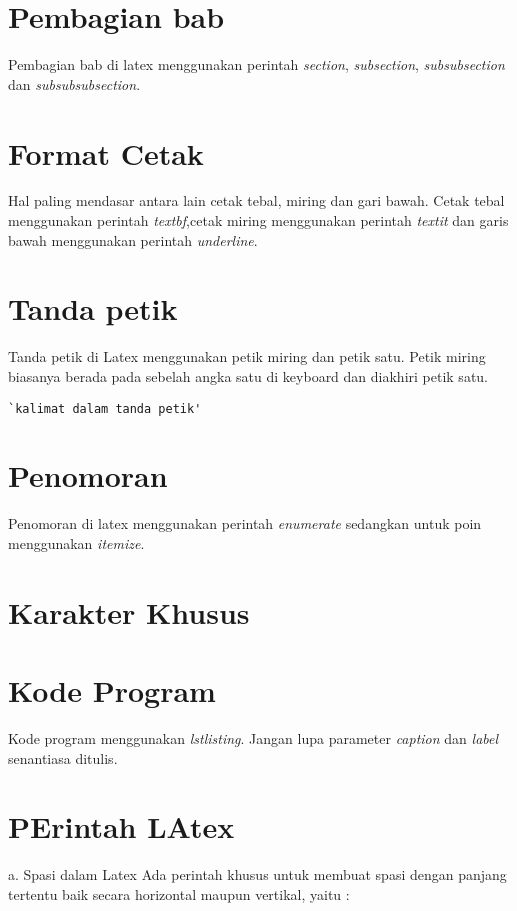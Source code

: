 \section{Pembagian bab}
Pembagian bab di latex menggunakan perintah \textit{section}, \textit{subsection}, \textit{subsubsection} dan \textit{subsubsubsection}.


\section{Format Cetak}
Hal paling mendasar antara lain cetak tebal, miring dan gari bawah. Cetak tebal menggunakan perintah \textit{textbf},cetak miring menggunakan perintah \textit{textit} dan garis bawah menggunakan perintah \textit{underline}.

\section{Tanda petik}
Tanda petik di Latex menggunakan petik miring dan petik satu. Petik miring biasanya berada pada sebelah angka satu di keyboard dan diakhiri petik satu.

\begin{lstlisting}[caption=Contoh kalimat dalam tanda petik di Latex,label={lst:tandapetik}]
`kalimat dalam tanda petik'
\end{lstlisting}

\section{Penomoran}
Penomoran di latex menggunakan perintah \textit{enumerate} sedangkan untuk poin menggunakan \textit{itemize}.

\section{Karakter Khusus}


\section{Kode Program}
Kode program menggunakan \textit{lstlisting}. Jangan lupa parameter \textit{caption} dan \textit{label} senantiasa ditulis.


\section {PErintah LAtex}
a. Spasi dalam Latex
Ada perintah khusus untuk membuat spasi dengan panjang tertentu baik secara horizontal maupun vertikal, yaitu :

